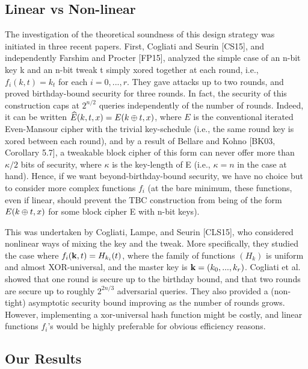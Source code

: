 \subsection{Linear vs Non-linear}


The investigation of the theoretical soundness of this design strategy was initiated in three
recent papers. First, Cogliati and Seurin [CS15], and independently Farshim and Procter [FP15],
analyzed the simple case of an n-bit key k and an n-bit tweak t simply xored together at each
round, i.e., $f_i(k,t) = k_t$ for each $i = 0, . . . , r$. They gave attacks up to two rounds, and proved
birthday-bound security for three rounds. In fact, the security of this construction caps at $2^{n/2}$
queries independently of the number of rounds. Indeed, it can be written $\widehat{E}(k, t, x) = E(k\oplus t, x)$,
where $E$ is the conventional iterated Even-Mansour cipher with the trivial key-schedule (i.e.,
the same round key is xored between each round), and by a result of Bellare and Kohno [BK03,
Corollary 5.7], a tweakable block cipher of this form can never offer more than $\kappa/2$ bits of
security, where $\kappa$ is the key-length of E (i.e., $\kappa = n$ in the case at hand). Hence, if we want
beyond-birthday-bound security, we have no choice but to consider more complex functions $f_i$
(at the bare minimum, these functions, even if linear, should prevent the TBC construction
from being of the form $E(k\oplus t, x)$ for some block cipher E with n-bit keys).




This was undertaken by Cogliati, Lampe, and Seurin [CLS15], who considered nonlinear
ways of mixing the key and the tweak. More specifically, they studied the case where $f_i(\mathbf{k}, t) =
H_{k_i}(t)$, where the family of functions $(H_k)$ is uniform and almost XOR-universal, and the
master key is $\mathbf{k} = (k_0, . . . , k_r)$. Cogliati et al. showed that one round is secure up to the birthday bound,
and that two rounds are secure up to roughly $2^{2n/3}$ adversarial queries. They also provided a
(non-tight) asymptotic security bound improving as the number of rounds grows. However,
implementing a xor-universal hash function might be costly, and linear functions $f_i$'s would be highly preferable for obvious efficiency reasons.




\subsection{Our Results}


